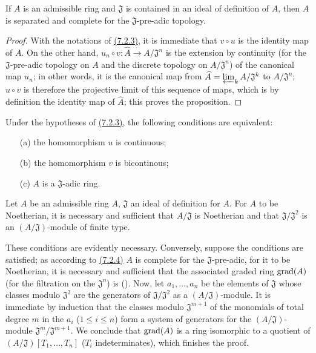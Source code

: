 \begin{prop}[7.2.4]
\label{prop-0.7.2.4}
If $A$ is an admissible ring and $\mathfrak{J}$ is contained in an ideal of
definition of $A$, then $A$ is separated and complete for the
$\mathfrak{J}$-pre-adic topology.
\end{prop}

\begin{proof}
\label{proof-prop-0.7.2.4}
With the notations of \hyperref[env-0.7.2.3]{(7.2.3)}, it is immediate that
$v\circ u$ is the identity map of $A$. On the other hand,
$u_n\circ v:\widehat{A}\to A/\mathfrak{J}^n$ is the extension by continuity (for
the $\mathfrak{J}$-pre-adic topology on $A$ and the discrete topology on
$A/\mathfrak{J}^n$) of the canonical map $u_n$; in other words, it is the
canonical map from $\widehat{A}=\varprojlim_k A/\mathfrak{J}^k$ to
$A/\mathfrak{J}^n$; $u\circ v$ is therefore the projective limit of this
sequence of maps, which is by definition the identity map of
$\widehat{A}$; this proves the proposition.
\end{proof}

\begin{cor}[7.2.5]
\label{cor-0.7.2.5}
Under the hypotheses of \hyperref[env-0.7.2.3]{(7.2.3)}, the following conditions are
equivalent:
\begin{itemize}
  \item[{\rm(a)}] the homomorphism $u$ is continuous;
  \item[{\rm(b)}] the homomorphism $v$ is bicontinous;
  \item[{\rm(c)}] $A$ is a $\mathfrak{J}$-adic ring.
\end{itemize}
\end{cor}

\begin{cor}[7.2.6]
\label{cor-0.7.2.6}
Let $A$ be an admissible ring $A$, $\mathfrak{J}$ an ideal of definition for
$A$. For $A$ to be Noetherian, it is necessary and sufficient that
$A/\mathfrak{J}$ is Noetherian and that $\mathfrak{J}/\mathfrak{J}^2$ is an
$(A/\mathfrak{J})$-module of finite type.
\end{cor}

These conditions are evidently necessary. Conversely, suppose the conditions
are satisfied; as according to \hyperref[prop-0.7.2.4]{(7.2.4)} $A$ is complete for the
$\mathfrak{J}$-pre-adic, for it to be Noetherian, it is necessary and sufficient
that the associated graded ring ${\mathop{\mathrm{grad}}\nolimits}(A)$ (for the filtration on the
$\mathfrak{J}^n$) is (\cite[p~.18--07, th.~4]{I-1}). Now, let $a_1,\dots,a_n$ be
the elements of $\mathfrak{J}$ whose classes modulo $\mathfrak{J}^2$ are the
generators of $\mathfrak{J}/\mathfrak{J}^2$ as a $(A/\mathfrak{J})$-module. It
is immediate by induction that the classes modulo $\mathfrak{J}^{m+1}$ of the
monomials of total degree $m$ in the $a_i$ ($1\leqslant i\leqslant n$) form a
system of generators for the $(A/\mathfrak{J})$-module
$\mathfrak{J}^m/\mathfrak{J}^{m+1}$. We conclude that ${\mathop{\mathrm{grad}}\nolimits}(A)$ is a ring
isomorphic to a quotient of $(A/\mathfrak{J})[T_1,\dots,T_n]$ ($T_i$
indeterminates), which finishes the proof.

